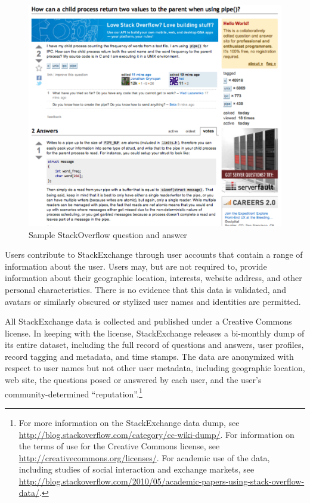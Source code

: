 \documentclass[11pt]{article}
\begin{document}
\begin{figure}[ht]
  \centering
  \includegraphics[width=\textwidth]{stack_question_answer}
  \caption{Sample StackOverflow question and answer}
  \label{fig:stack-question-answer}
\end{figure}

Users contribute to StackExchange through user accounts that contain a
range of information about the user. Users may, but are not required
to, provide information about their geographic location, interests,
website address, and other personal characteristics. There is no
evidence that this data is validated, and avatars or similarly
obscured or stylized user names and identities are permitted. 


All StackExchange data is collected and published under a Creative
Commons license. In keeping with the license, StackExchange releases
a bi-monthly dump of its entire dataset, including the full record of
questions and answers, user profiles, record tagging and metadata, and
time stamps. The data are anonymized with respect to user names but
not other user metadata, including geographic location, web site,
the questions posed or answered by each user, and the
user's community-determined ``reputation''.\footnote{For more
  information on the StackExchange data dump, see
  \url{http://blog.stackoverflow.com/category/cc-wiki-dump/}. 
   For information
  on the terms of use for the Creative Commons license, see
  \url{http://creativecommons.org/licenses/}. For academic use of the
  data, including studies of social interaction and exchange markets,
  see \url{http://blog.stackoverflow.com/2010/05/academic-papers-using-stack-overflow-data/}.}
\end{document}
